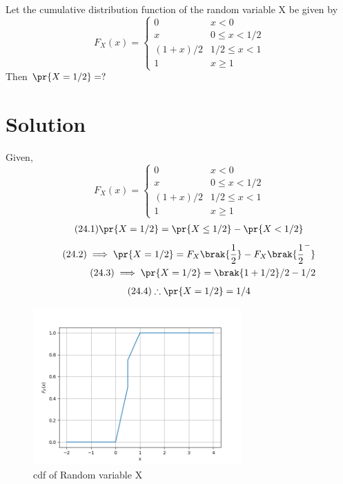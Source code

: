 
    Let the cumulative distribution function of the random variable X be given by 
    $$F_{X}(x)=\left\{
    \begin{array}{ll}
      0 & x<0 \\
      x & 0\leq x<1/2\\
      (1+x)/2 & 1/2\leq x <1\\
      1 & x\geq 1
    \end{array} 
    \right. $$
    Then $\pr{X=1/2}=?$
\section*{Solution}
Given,
$$F_{X}(x)=\left\{
    \begin{array}{ll}
      0 & x<0 \\
      x & 0\leq x<1/2\\
      (1+x)/2 & 1/2\leq x <1\\
      1 & x\geq 1
    \end{array} 
    \right. $$
\begin{align}
\tag{24.1}
\pr{X=1/2}=\pr{X\leq 1/2}-\pr{X<1/2}
\end{align}
\begin{align}
\tag{24.2}
\implies \pr{X=1/2}=F_{X}\brak{\frac{1}{2}}-F_{X}\brak{\frac{1}{2}^-}\\
\tag{24.3}
\implies \pr{X=1/2}=\brak{1+1/2}/2-1/2
\end{align}
\begin{align}
\tag{24.4}
\therefore \pr{X=1/2}=1/4
\end{align}
\newpage
\begin{figure}[t!]
\centering
\includegraphics[width=8cm]{cdf_plot.png}
\caption{cdf of Random variable X}
\end{figure}

